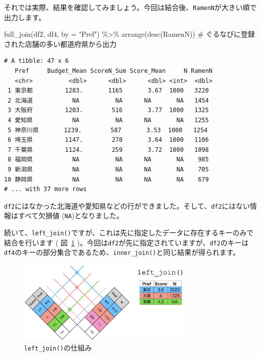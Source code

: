 \documentclass[
  a4paper,
  pandoc,
  ja=standard,
  jafont=haranoaji]{bxjsbook}
\newenvironment{Shaded}{\begin{snugshade}}{\end{snugshade}}
\newcommand{\AttributeTok}[1]{\textcolor[rgb]{0.00,0.48,0.65}{#1}}
\newcommand{\CommentTok}[1]{\textcolor[rgb]{0.37,0.37,0.37}{#1}}
\newcommand{\FunctionTok}[1]{\textcolor[rgb]{0.28,0.35,0.67}{#1}}
\newcommand{\NormalTok}[1]{\textcolor[rgb]{0.00,0.48,0.65}{#1}}
\newcommand{\SpecialCharTok}[1]{\textcolor[rgb]{0.37,0.37,0.37}{#1}}
\newcommand{\StringTok}[1]{\textcolor[rgb]{0.13,0.47,0.30}{#1}}
\begin{document}
それでは実際、結果を確認してみましょう。今回は結合後、\texttt{RamenN}が大きい順で出力します。

\begin{Shaded}
\begin{Highlighting}[numbers=left,,]
\FunctionTok{full\_join}\NormalTok{(df2, df4, }\AttributeTok{by =} \StringTok{"Pref"}\NormalTok{) }\SpecialCharTok{\%\textgreater{}\%}
  \FunctionTok{arrange}\NormalTok{(}\FunctionTok{desc}\NormalTok{(RamenN)) }\CommentTok{\# ぐるなびに登録された店舗の多い都道府県から出力}
\end{Highlighting}
\end{Shaded}

\begin{verbatim}
# A tibble: 47 x 6
   Pref     Budget_Mean ScoreN_Sum Score_Mean     N RamenN
   <chr>          <dbl>      <dbl>      <dbl> <int>  <dbl>
 1 東京都         1283.       1165       3.67  1000   3220
 2 北海道           NA          NA      NA       NA   1454
 3 大阪府         1203.        516       3.77  1000   1325
 4 愛知県           NA          NA      NA       NA   1255
 5 神奈川県       1239.        587       3.53  1000   1254
 6 埼玉県         1147.        278       3.64  1000   1106
 7 千葉県         1124.        259       3.72  1000   1098
 8 福岡県           NA          NA      NA       NA    985
 9 新潟県           NA          NA      NA       NA    705
10 静岡県           NA          NA      NA       NA    679
# ... with 37 more rows
\end{verbatim}

\texttt{df2}にはなかった北海道や愛知県などの行ができました。そして、\texttt{df2}にはない情報はすべて欠損値
(\texttt{NA})となりました。

続いて、\texttt{left\_join()}ですが、これは先に指定したデータに存在するキーのみで結合を行います
( 図~\ref{fig-handling2_merge_left}
)。今回は\texttt{df2}が先に指定されていますが、\texttt{df2}のキーは\texttt{df4}のキーの部分集合であるため、\texttt{inner\_join()}と同じ結果が得られます。

\begin{figure}

{\centering \includegraphics[width=0.75\textwidth,height=\textheight]{./Figs/Handling2/Merge_Left.png}

}

\caption{\label{fig-handling2_merge_left}\texttt{left\_join()}の仕組み}

\end{figure}
\end{document}

